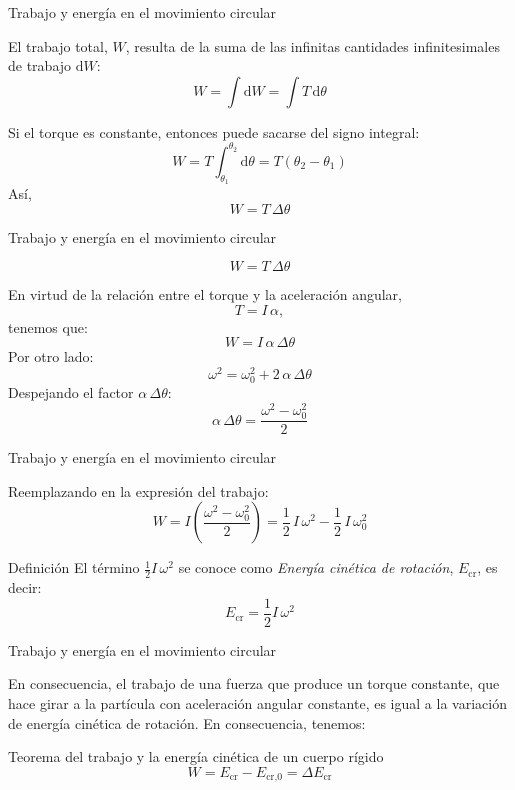 \documentclass[11pt,handout,aspectratio=1610]{beamer}
\begin{document}
\begin{frame}{Trabajo y energía en el movimiento circular}

    El trabajo total, $W$, resulta de la suma de las infinitas cantidades infinitesimales de trabajo $\text{d}W$: $$W = \int \text{d}W = \int T \, \text{d} \theta$$ \pause 

    \vspace{11pt}

    Si el torque es constante, entonces puede sacarse del signo integral: $$W = T \int_{\theta_1}^{\theta_2} \text{d} \theta = T \left(\theta_2 - \theta_1\right)$$ Así,
    \begin{equation*}
        \boxed{W = T \, \Delta \theta}
    \end{equation*}

\end{frame}

\begin{frame}{Trabajo y energía en el movimiento circular}

    \begin{equation*}
        W = T \, \Delta \theta
    \end{equation*}

    En virtud de la relación entre el torque y la aceleración angular, $$T = I \, \alpha,$$ tenemos que: $$W = I \, \alpha \, \Delta \theta$$ Por otro lado: $$\omega^2 = \omega_0^2 + 2 \, \alpha \, \Delta \theta$$ Despejando el factor $\alpha \, \Delta \theta$: $$\alpha \, \Delta \theta = \frac{\omega^2 - \omega_0^2}{2}$$

\end{frame}

\begin{frame}{Trabajo y energía en el movimiento circular}

    Reemplazando en la expresión del trabajo: $$W = I \left(\frac{\omega^2 - \omega_0^2}{2}\right) = \frac{1}{2} \, I \, \omega^2 - \frac{1}{2} \, I \, \omega_0^2$$ 
    
    \begin{block}{Definición}
        El término $\frac{1}{2} I \, \omega^2$ se conoce como \emph{Energía cinética de rotación}, $E_\text{cr}$, es decir: $$E_\text{cr} = \frac{1}{2} I \, \omega^2 $$
    \end{block}
    
\end{frame}

\begin{frame}{Trabajo y energía en el movimiento circular}  

    En consecuencia, el trabajo de una fuerza que produce un torque constante, que hace girar a la partícula con aceleración angular constante, es igual a la variación de energía cinética de rotación. En consecuencia, tenemos:
    
    \begin{block}{Teorema del trabajo y la energía cinética de un cuerpo rígido}
        $$W = E_\text{cr} - E_{\text{cr,}0} = \Delta E_\text{cr}$$    
    \end{block}
    

\end{frame}
\end{document}
